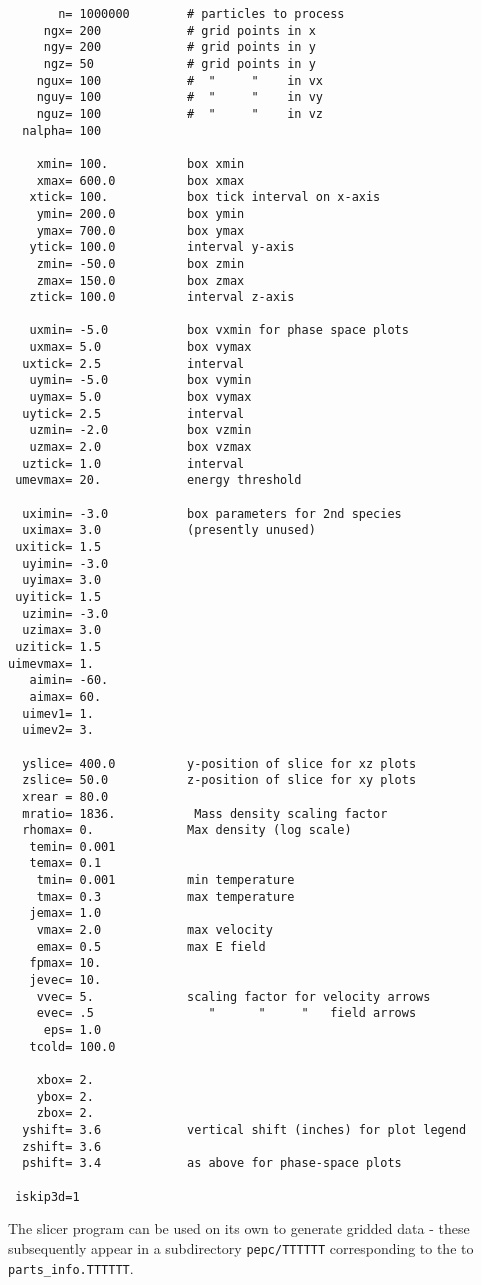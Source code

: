\documentclass[11pt,psfig]{article}
\begin{document}
\small
\begin{verbatim}
       n= 1000000        # particles to process
     ngx= 200            # grid points in x
     ngy= 200            # grid points in y
     ngz= 50             # grid points in y
    ngux= 100            #  "     "    in vx
    nguy= 100            #  "     "    in vy
    nguz= 100            #  "     "    in vz
  nalpha= 100

    xmin= 100.           box xmin
    xmax= 600.0          box xmax
   xtick= 100.           box tick interval on x-axis
    ymin= 200.0          box ymin
    ymax= 700.0          box ymax
   ytick= 100.0          interval y-axis
    zmin= -50.0          box zmin
    zmax= 150.0          box zmax
   ztick= 100.0          interval z-axis

   uxmin= -5.0           box vxmin for phase space plots
   uxmax= 5.0            box vymax
  uxtick= 2.5            interval
   uymin= -5.0           box vymin
   uymax= 5.0            box vymax
  uytick= 2.5            interval
   uzmin= -2.0           box vzmin
   uzmax= 2.0            box vzmax
  uztick= 1.0            interval
 umevmax= 20.            energy threshold

  uximin= -3.0           box parameters for 2nd species
  uximax= 3.0            (presently unused)
 uxitick= 1.5
  uyimin= -3.0
  uyimax= 3.0
 uyitick= 1.5
  uzimin= -3.0
  uzimax= 3.0
 uzitick= 1.5
uimevmax= 1.
   aimin= -60.
   aimax= 60.
  uimev1= 1.
  uimev2= 3.

  yslice= 400.0          y-position of slice for xz plots
  zslice= 50.0           z-position of slice for xy plots
  xrear = 80.0
  mratio= 1836.           Mass density scaling factor
  rhomax= 0.             Max density (log scale)
   temin= 0.001
   temax= 0.1
    tmin= 0.001          min temperature
    tmax= 0.3            max temperature
   jemax= 1.0
    vmax= 2.0            max velocity
    emax= 0.5            max E field
   fpmax= 10.
   jevec= 10.
    vvec= 5.             scaling factor for velocity arrows
    evec= .5                "      "     "   field arrows
     eps= 1.0
   tcold= 100.0

    xbox= 2.
    ybox= 2.
    zbox= 2.
  yshift= 3.6            vertical shift (inches) for plot legend
  zshift= 3.6
  pshift= 3.4            as above for phase-space plots

 iskip3d=1
\end{verbatim}
\normalsize

\noindent
The slicer program can be used on its own to generate gridded data -
these subsequently appear in a subdirectory \texttt{pepc/TTTTTT} corresponding to the
to \texttt{parts_info.TTTTTT}.
\end{document}
